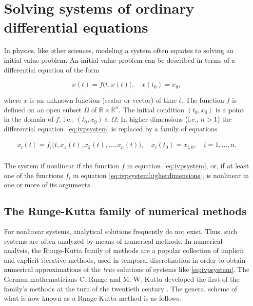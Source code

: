 \section{Solving systems of ordinary differential equations}
\label{sec:solvingsystems}

In physics, like other sciences, modeling a system often equates to solving
an initial value problem. An initial value problem can be described in terms
of a differential equation of the form

\begin{equation}
    \label{eq:ivpsystem}
    \dot{x}(t) = f\big(t,x(t)\big),\quad{}x(t_{0})=x_{0},
\end{equation}

where $x$ is an unknown function (scalar or vector) of time $t$. The function
$f$ is defined on an open subset $\Omega$ of $\mathbb{R}\times\mathbb{R}^{n}$.
The initial condition $(t_{0},x_{0})$ is a point in the domain of $f$, i.e.,
$(t_{0},x_{0})\in\Omega$. In higher dimensions (i.e., $n>1$) the differential
equation~\eqref{eq:ivpsystem} is replaced by a family of equations

\begin{equation}
\label{eq:ivpsystemhigherdimensions}
\begin{gathered}
    \dot{x}_{i}(t) = f_{i}\big(t,x_{1}(t),x_{2}(t),\ldots,x_{n}(t)\big),\quad
    x_{i}(t_{0})=x_{i,0},\quad{}i=1,\ldots,n. \\
\end{gathered}
\end{equation}

The system if nonlinear if the function $f$ in equation~\eqref{eq:ivpsystem},
or, if at least one of the functions $f_{i}$ in equation
\eqref{eq:ivpsystemhigherdimensions}, is nonlinear in one or more of its
arguments.

\subsection{The Runge-Kutta family of numerical methods}
\label{sub:the_runge_kutta_family_of_numerical_methods}

For nonlinear systems, analytical solutions frequently do not exist. Thus, such
systems are often analyzed by means of numerical methods. In numerical analysis,
the Runge-Kutta family of methods are a popular collection of implicit
and explicit iterative methods, used in temporal discretization in order to
obtain numerical approximations of the \emph{true} solutions of systems like
\eqref{eq:ivpsystem}. The German mathematicians C. Runge and M. W. Kutta
developed the first of the family's methods at the turn of the twentieth century
\parencite[p.134]{hairer1993solving}. The general scheme of
what is now known as a Runge-Kutta method is as follows: \\


